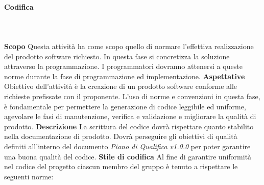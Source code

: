 		\paragraph{Codifica} \mbox{}\\ \mbox{}\\
			\textbf{Scopo} \newline \newline
			Questa attività ha come scopo quello di normare l'effettiva realizzazione del prodotto software richiesto. In questa fase si concretizza la soluzione attraverso la programmazione. I programmatori dovranno attenersi a queste norme durante la fase di programmazione ed implementazione. \newline \newline
			\textbf{Aspettative} \newline \newline
			Obiettivo dell’attività è la creazione di un prodotto software conforme alle richieste	prefissate con il proponente.
			L'uso di norme e convenzioni in questa fase, è fondamentale per permettere la generazione di codice leggibile ed uniforme,  agevolare le fasi di manutenzione,  verifica e validazione e migliorare la qualità di prodotto. \newline \newline
			\textbf{Descrizione} \newline \newline
			La scrittura del codice dovrà rispettare quanto stabilito nella documentazione di prodotto. Dovrà perseguire gli obiettivi di qualità definiti all’interno del documento \textit{Piano di Qualifica v1.0.0} per poter garantire una buona qualità del codice. \newline \newline
			\textbf{Stile di codifica} \newline \newline
			Al fine di garantire uniformità nel codice del progetto ciascun membro del gruppo è
			tenuto a rispettare le seguenti norme:
